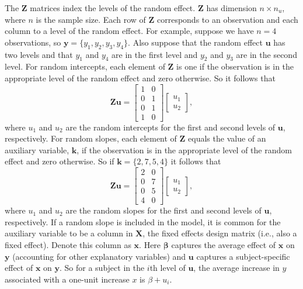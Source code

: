 \documentclass[10pt,letterpaper]{article}
\begin{document}
The \(\mathbf{Z}\) matrices index the levels of the random effect.
\(\mathbf{Z}\) has dimension \(n \times n_u\), where \(n\) is the sample
size. Each row of \(\mathbf{Z}\) corresponds to an observation and each
column to a level of the random effect. For example, suppose we have
\(n = 4\) observations, so \(\mathbf{y} = \{y_1, y_2, y_3, y_4\}\). Also
suppose that the random effect \(\mathbf{u}\) has two levels and that
\(y_1\) and \(y_4\) are in the first level and \(y_2\) and \(y_3\) are
in the second level. For random intercepts, each element of
\(\mathbf{Z}\) is one if the observation is in the appropriate level of
the random effect and zero otherwise. So it follows that
\begin{equation*}
\mathbf{Z}\mathbf{u} = 
\begin{bmatrix}
1 & 0 \\
0 & 1 \\
0 & 1 \\
1 & 0
\end{bmatrix}
\begin{bmatrix}
u_1 \\
u_2
\end{bmatrix},
\end{equation*} where \(u_1\) and \(u_2\) are the random intercepts for
the first and second levels of \(\mathbf{u}\), respectively. For random
slopes, each element of \(\mathbf{Z}\) equals the value of an auxiliary
variable, \(\mathbf{k}\), if the observation is in the appropriate level
of the random effect and zero otherwise. So if
\(\mathbf{k} = \{2, 7, 5, 4 \}\) it follows that \begin{equation*}
\mathbf{Z}\mathbf{u} = 
\begin{bmatrix}
2 & 0 \\
0 & 7 \\
0 & 5 \\
4 & 0
\end{bmatrix}
\begin{bmatrix}
u_1 \\
u_2
\end{bmatrix},
\end{equation*} where \(u_1\) and \(u_2\) are the random slopes for the
first and second levels of \(\mathbf{u}\), respectively. If a random
slope is included in the model, it is common for the auxiliary variable
to be a column in \(\mathbf{X}\), the fixed effects design matrix (i.e.,
also a fixed effect). Denote this column as \(\mathbf{x}\). Here
\(\boldsymbol{\beta}\) captures the average effect of \(\mathbf{x}\) on
\(\mathbf{y}\) (accounting for other explanatory variables) and
\(\mathbf{u}\) captures a subject-specific effect of \(\mathbf{x}\) on
\(\mathbf{y}\). So for a subject in the \(i\)th level of \(\mathbf{u}\),
the average increase in \(y\) associated with a one-unit increase \(x\)
is \(\beta + u_i\).
\end{document}
